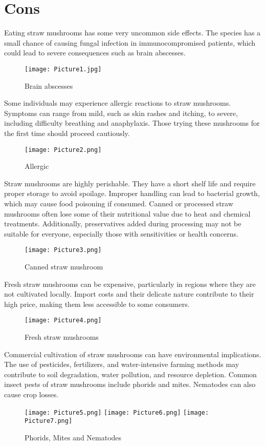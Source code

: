 \chapter{Cons}
\fontsize{16pt}{16pt}\normalfont

Eating straw mushrooms has some very uncommon side effects. The species has a small chance of causing fungal infection in immunocompromised patients, which could lead to severe consequences such as brain abscesses.\par
\begin{figure}[h]
    \texttt{[image: Picture1.jpg]}
    \caption{Brain abscesses}
\end{figure}\par
Some individuals may experience allergic reactions to straw mushrooms. Symptoms can range from mild, such as skin rashes and itching, to severe, including difficulty breathing and anaphylaxis. Those trying these mushrooms for the first time should proceed cautiously.\par
\begin{figure}[h]
    \texttt{[image: Picture2.png]}
    \caption{Allergic}
\end{figure}\par
Straw mushrooms are highly perishable. They have a short shelf life and require proper storage to avoid spoilage. Improper handling can lead to bacterial growth, which may cause food poisoning if consumed.
\medbreak
Canned or processed straw mushrooms often lose some of their nutritional value due to heat and chemical treatments. Additionally, preservatives added during processing may not be suitable for everyone, especially those with sensitivities or health concerns.\par
\begin{figure}[h]
    \texttt{[image: Picture3.png]}
    \caption{Canned straw mushroom}
\end{figure}\par
Fresh straw mushrooms can be expensive, particularly in regions where they are not cultivated locally. Import costs and their delicate nature contribute to their high price, making them less accessible to some consumers.\par
\begin{figure}[h]
    \texttt{[image: Picture4.png]}
    \caption{Fresh straw mushrooms}
\end{figure}\par
Commercial cultivation of straw mushrooms can have environmental implications. The use of pesticides, fertilizers, and water-intensive farming methods may contribute to soil degradation, water pollution, and resource depletion.
\medbreak
Common insect pests of straw mushrooms include phorids and mites. Nematodes can also cause crop losses.
\begin{figure}[!htb]
    \texttt{[image: Picture5.png]}
\endminipage\hfill
{}
    \texttt{[image: Picture6.png]}
\endminipage\hfill
{}
    \texttt{[image: Picture7.png]}
    \caption{Phorids, Mites and Nematodes}
\endminipage\hfill
\end{figure}